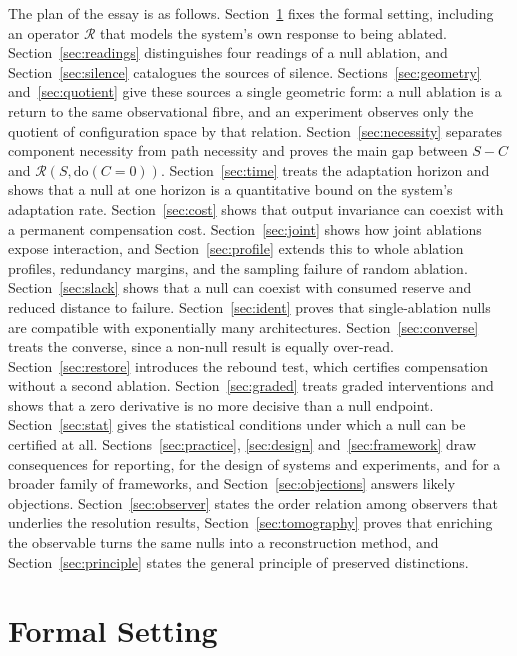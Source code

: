 \documentclass[11pt]{article}
\theoremstyle{definition}
\theoremstyle{remark}
\newcommand{\Rop}{\mathcal{R}}
\newcommand{\dox}[1]{\mathrm{do}(#1)}
\begin{document}
The plan of the essay is as follows. Section~\ref{sec:setting} fixes the formal setting, including an operator $\Rop$ that models the system's own response to being ablated. Section~\ref{sec:readings} distinguishes four readings of a null ablation, and Section~\ref{sec:silence} catalogues the sources of silence. Sections~\ref{sec:geometry} and~\ref{sec:quotient} give these sources a single geometric form: a null ablation is a return to the same observational fibre, and an experiment observes only the quotient of configuration space by that relation. Section~\ref{sec:necessity} separates component necessity from path necessity and proves the main gap between $S-C$ and $\Rop(S,\dox{C=0})$. Section~\ref{sec:time} treats the adaptation horizon and shows that a null at one horizon is a quantitative bound on the system's adaptation rate. Section~\ref{sec:cost} shows that output invariance can coexist with a permanent compensation cost. Section~\ref{sec:joint} shows how joint ablations expose interaction, and Section~\ref{sec:profile} extends this to whole ablation profiles, redundancy margins, and the sampling failure of random ablation. Section~\ref{sec:slack} shows that a null can coexist with consumed reserve and reduced distance to failure. Section~\ref{sec:ident} proves that single-ablation nulls are compatible with exponentially many architectures. Section~\ref{sec:converse} treats the converse, since a non-null result is equally over-read. Section~\ref{sec:restore} introduces the rebound test, which certifies compensation without a second ablation. Section~\ref{sec:graded} treats graded interventions and shows that a zero derivative is no more decisive than a null endpoint. Section~\ref{sec:stat} gives the statistical conditions under which a null can be certified at all. Sections~\ref{sec:practice}, \ref{sec:design} and~\ref{sec:framework} draw consequences for reporting, for the design of systems and experiments, and for a broader family of frameworks, and Section~\ref{sec:objections} answers likely objections. Section~\ref{sec:observer} states the order relation among observers that underlies the resolution results, Section~\ref{sec:tomography} proves that enriching the observable turns the same nulls into a reconstruction method, and Section~\ref{sec:principle} states the general principle of preserved distinctions.

\section{Formal Setting}\label{sec:setting}
\end{document}
